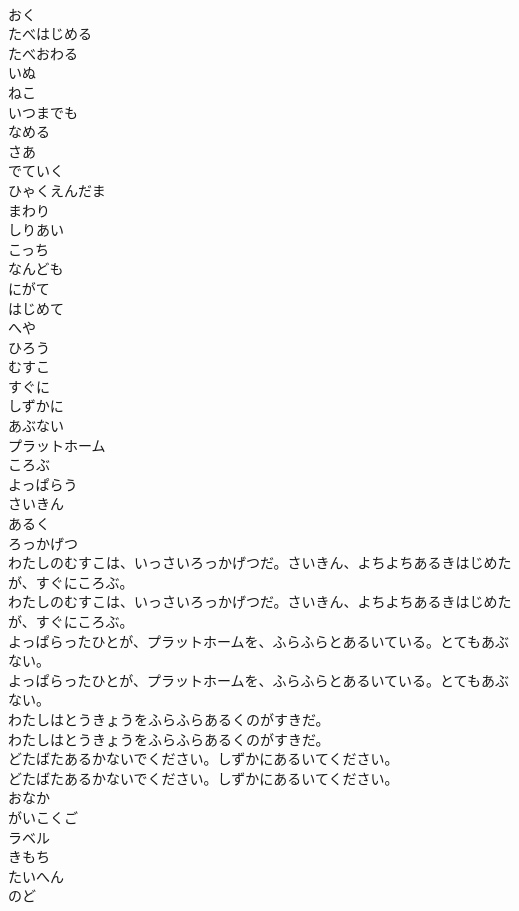 \documentclass[8pt]{extreport}
\begin{document}
\begin{CJK}{UTF8}{min}
\\	おく
\\	たべはじめる
\\	たべおわる
\\	いぬ
\\	ねこ
\\	いつまでも
\\	なめる
\\	さあ
\\	でていく
\\	ひゃくえんだま
\\	まわり
\\	しりあい
\\	こっち
\\	なんども
\\	にがて
\\	はじめて
\\	へや
\\	ひろう
\\	むすこ
\\	すぐに
\\	しずかに
\\	あぶない
\\	プラットホーム
\\	ころぶ
\\	よっぱらう
\\	さいきん
\\	あるく
\\	ろっかげつ
\\	わたしのむすこは、いっさいろっかげつだ。さいきん、よちよちあるきはじめたが、すぐにころぶ。	
\\	わたしのむすこは、いっさいろっかげつだ。さいきん、よちよちあるきはじめたが、すぐにころぶ。 
\\	よっぱらったひとが、プラットホームを、ふらふらとあるいている。とてもあぶない。	
\\	よっぱらったひとが、プラットホームを、ふらふらとあるいている。とてもあぶない。 
\\	わたしはとうきょうをふらふらあるくのがすきだ。	
\\	わたしはとうきょうをふらふらあるくのがすきだ。 
\\	どたばたあるかないでください。しずかにあるいてください。	
\\	どたばたあるかないでください。しずかにあるいてください。 
\\	おなか
\\	がいこくご
\\	ラベル
\\	きもち
\\	たいへん
\\	のど

\end{CJK}
\end{document}
